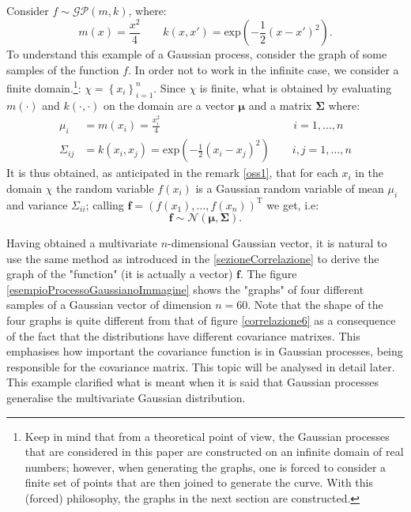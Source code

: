 \vspace{0.5cm}

\begin{ese} \label{esempioProcessoGaussiano}
Consider $f\sim \mathcal{GP}(m,k)$, where:
\[
m(x)=\frac{x^2}{4}\qquad k(x,x')=\text{exp}\left( -\frac{1}{2}(x-x')^2\right).
\]
To understand this example of a Gaussian process, consider the graph of some samples of the function $f$. In order not to work in the infinite case, we consider a finite domain.\footnote{Keep in mind that from a theoretical point of view, the Gaussian processes that are considered in this paper are constructed on an infinite domain of real numbers; however, when generating the graphs, one is forced to consider a finite set of points that are then joined to generate the curve. With this (forced) philosophy, the graphs in the next section are constructed.\label{footnote 1}}: $\chi = \left\{x_i \right\}_{i=1}^{n}$. Since $\chi$ is finite, what is obtained by evaluating $m(\cdot)$ and $k(\cdot,\cdot)$ on the domain are a vector $\bm{\mu}$ and a matrix $\bm{\Sigma}$ where:
\[
\begin{split}
\mu_i&=m(x_i)=\frac{x_i^2}{4} \qquad\qquad\qquad\qquad\qquad\qquad i=1,\dots, n \\
\Sigma_{ij}&=k(x_i,x_j)=\text{exp}\left( -\frac{1}{2}(x_i-x_j)^2\right)\qquad i,j=1,\dots, n
\end{split}
\]
It is thus obtained, as anticipated in the remark \ref{oss1}, that for each $x_i$ in the domain $\chi$ the random variable $f(x_i)$ is a Gaussian random variable of mean $\mu_i$ and variance $\Sigma_{ii}$; calling $\bm{f}=(f(x_1), \dots, f(x_n))^{\text{T}}$ we get, i.e: 
\[
\bm{f}\sim \mathcal{N}(\bm{\mu}, \bm{\Sigma}).
\]

\newpage

Having obtained a multivariate $n$-dimensional Gaussian vector, it is natural to use the same method as introduced in the \ref{sezioneCorrelazione} to derive the graph of the "function" (it is actually a vector) $\bm{f}$. The figure \ref{esempioProcessoGaussianoImmagine} shows the "graphs" of four different samples of a Gaussian vector of dimension $n=60$. Note that the shape of the four graphs is quite different from that of figure \ref{correlazione6} as a consequence of the fact that the distributions have different covariance matrixes. This emphasises how important the covariance function is in Gaussian processes, being responsible for the covariance matrix. This topic will be analysed in detail later.\newline
This example clarified what is meant when it is said that Gaussian processes generalise the multivariate Gaussian distribution.


\end{ese}
